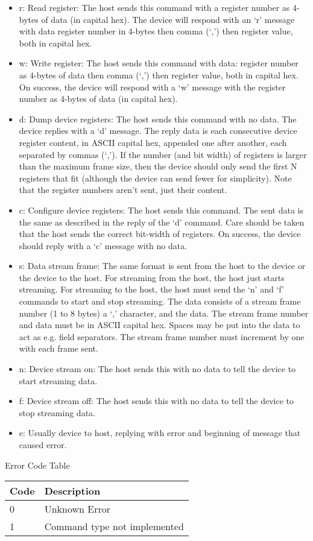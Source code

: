 \documentclass{customdocclass}
\begin{document}
\begin{itemize}
  \item r: Read register: The host sends this command with a register number as 4-bytes of data (in capital hex). The device will respond with an `r' message with data register number in 4-bytes then comma (`,') then register value, both in capital hex.
  \item w: Write register: The host sends this command with data: register number as 4-bytes of data then comma (`,') then register value, both in capital hex. On success, the device will respond with a `w' message with the register number as 4-bytes of data (in capital hex).
  \item d: Dump device registers: The host sends this command with no data. The device replies with a `d' message. The reply data is each consecutive device register content, in ASCII capital hex, appended one after another, each separated by commas (`,'). If the number (and bit width) of registers is larger than the maximum frame size, then the device should only send the first N registers that fit (although the device can send fewer for simplicity). Note that the register numbers aren't sent, just their content.
  \item c: Configure device registers: The host sends this command. The sent data is the same as described in the reply of the `d' command. Care should be taken that the host sends the correct bit-width of registers. On success, the device should reply with a `c' message with no data.
  \item s: Data stream frame: The same format is sent from the host to the device or the device to the host. For streaming from the host, the host just starts streaming. For streaming to the host, the host must send the `n' and `f' commands to start and stop streaming. The data consists of a stream frame number (1 to 8 bytes) a `,' character, and the data. The stream frame number and data must be in ASCII capital hex. Spaces may be put into the data to act as e.g. field separators. The stream frame number must increment by one with each frame sent.
  \item n: Device stream on: The host sends this with no data to tell the device to start streaming data.
  \item f: Device stream off: The host sends this with no data to tell the device to stop streaming data.
  \item e: Usually device to host, replying with error and beginning of message that caused error.
\end{itemize}

\begin{center}
\small
Error Code Table
\begin{tabularx}{\textwidth}{|l|X|} \hline
Code & Description \\ \hline
0 & Unknown Error \\ \hline
1 & Command type not implemented \\ \hline
\end{tabularx}
\end{center}
\end{document}
